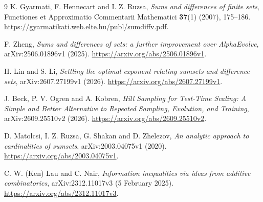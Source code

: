 \documentclass[11pt,a4paper]{article}
\begin{document}
\begin{thebibliography}{9}
K. Gyarmati, F. Hennecart and I. Z. Ruzsa,
\emph{Sums and differences of finite sets},
Functiones et Approximatio Commentarii Mathematici
\textbf{37}(1) (2007), 175--186.
\url{https://gyarmatikati.web.elte.hu/publ/sumdiffv.pdf}.

F. Zheng,
\emph{Sums and differences of sets: a further improvement over AlphaEvolve},
arXiv:2506.01896v1 (2025).
\url{https://arxiv.org/abs/2506.01896v1}.

H. Lin and S. Li,
\emph{Settling the optimal exponent relating sumsets and difference sets},
arXiv:2607.27199v1 (2026).
\url{https://arxiv.org/abs/2607.27199v1}.

J. Beck, P. V. Ogren and A. Kobren,
\emph{Hill Sampling for Test-Time Scaling: A Simple and Better Alternative
to Repeated Sampling, Evolution, and Training},
arXiv:2609.25510v2 (2026).
\url{https://arxiv.org/abs/2609.25510v2}.

D. Matolcsi, I. Z. Ruzsa, G. Shakan and D. Zhelezov,
\emph{An analytic approach to cardinalities of sumsets},
arXiv:2003.04075v1 (2020).
\url{https://arxiv.org/abs/2003.04075v1}.

C. W. (Ken) Lau and C. Nair,
\emph{Information inequalities via ideas from additive combinatorics},
arXiv:2312.11017v3 (5 February 2025).
\url{https://arxiv.org/abs/2312.11017v3}.
\end{thebibliography}
\end{document}
